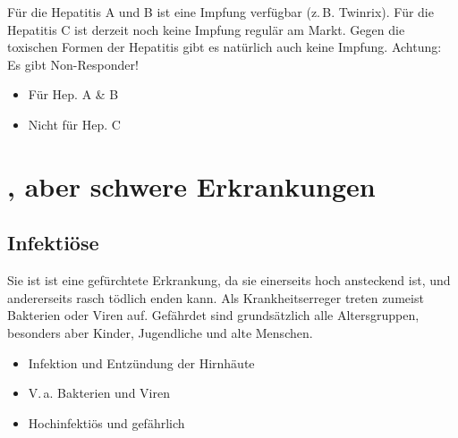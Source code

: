 {%
%
%
Für die Hepatitis A und B ist eine Impfung verfügbar (z.\,B.
Twinrix{\texttrademark}). Für die Hepatitis C ist derzeit
noch keine Impfung regulär am Markt. Gegen die toxischen
Formen der Hepatitis gibt es natürlich auch keine Impfung.
Achtung: Es gibt Non-Responder!
}{
\begin{itemize}
  \item Für Hep. A \& B
  \item Nicht für Hep. C
\end{itemize}
}
{}
{}
{}

\begin{Synopsis}
\end{Synopsis}


\section{, aber schwere Erkrankungen}

\subsection{Infektiöse }
\label{topic:meningitis}

\TextSlide{{\TxBeschreibung}}
{%
Sie ist ist eine gefürchtete
Erkrankung, da sie einerseits hoch ansteckend ist, und andererseits
rasch tödlich enden kann. 
%
Als Krankheitserreger treten zumeist Bakterien oder Viren auf.
%
Gefährdet sind grundsätzlich
alle Altersgruppen, besonders aber Kinder, Jugendliche und
alte Menschen.
}
{%
\begin{itemize}
  \item Infektion und Entzündung der Hirnhäute
  \item V.\,a. Bakterien und Viren
  \item Hochinfektiös und gefährlich
\end{itemize}
}

